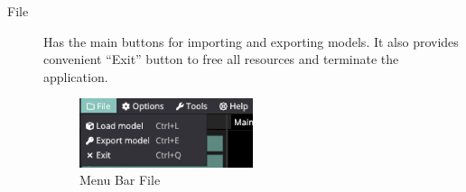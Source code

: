 \documentclass[11pt]{article}
\begin{document}
 
\begin{description}
  \item[File] 
    Has the main buttons for importing and exporting models. It also provides
    convenient ``Exit'' button to free all resources and terminate the
    application.
    \begin{figure}[H]
      \centering
      \includegraphics[width=0.5\textwidth]{images/menu_bar_file.png}
      \caption{Menu Bar File}
      \label{fig:menu_bar_file}
    \end{figure}


\end{description}
\end{document}
